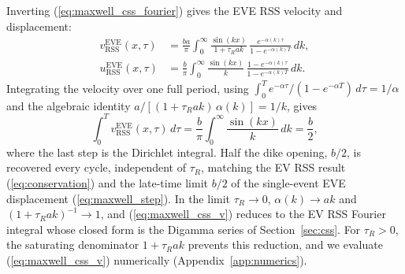 \documentclass[extra]{gji}
\begin{document}
Inverting (\ref{eq:maxwell_css_fourier}) gives the EVE RSS velocity
and displacement:
\begin{align}
  v_{\text{RSS}}^{\text{EVE}}(x,\tau)
  &= \frac{b a}{\pi}\int_0^{\infty}
     \frac{\sin(kx)}{1+\tau_R ak}\,
     \frac{e^{-\alpha(k)\tau}}{1-e^{-\alpha(k)T}}\,dk,
  \label{eq:maxwell_css_v} \\
  u_{\text{RSS}}^{\text{EVE}}(x,\tau)
  &= \frac{b}{\pi}\int_0^{\infty}
     \frac{\sin(kx)}{k}\,
     \frac{1-e^{-\alpha(k)\tau}}{1-e^{-\alpha(k)T}}\,dk.
  \label{eq:maxwell_css_u}
\end{align}
Integrating the velocity over one full period, using
$\int_0^T e^{-\alpha\tau}/(1-e^{-\alpha T})\,d\tau = 1/\alpha$ and the
algebraic identity $a/[(1+\tau_R ak)\,\alpha(k)] = 1/k$, gives
\begin{equation}
  \int_0^T v_{\text{RSS}}^{\text{EVE}}(x,\tau)\,d\tau
  = \frac{b}{\pi}\int_0^{\infty}
    \frac{\sin(kx)}{k}\,dk = \frac{b}{2},
\end{equation}
where the last step is the Dirichlet integral. Half the dike opening,
$b/2$, is recovered every cycle, independent of $\tau_R$, matching the EV
RSS result (\ref{eq:conservation}) and the late-time limit $b/2$ of the
single-event EVE displacement (\ref{eq:maxwell_step}). In the limit
$\tau_R\to 0$, $\alpha(k)\to ak$ and $(1+\tau_R ak)^{-1}\to 1$, and
(\ref{eq:maxwell_css_v}) reduces to the EV RSS Fourier integral whose
closed form is the Digamma series of Section~\ref{sec:css}.  For
$\tau_R > 0$, the saturating denominator $1+\tau_R ak$ prevents this
reduction, and we evaluate (\ref{eq:maxwell_css_v}) numerically
(Appendix~\ref{app:numerics}).
\end{document}

